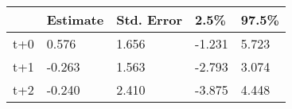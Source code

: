 \begin{tabular}{lllll}
  \toprule
  & Estimate & Std. Error & 2.5\% & 97.5\% \\ 
  \midrule
t+0 & 0.576 & 1.656 & -1.231 & 5.723 \\ 
  t+1 & -0.263 & 1.563 & -2.793 & 3.074 \\ 
  t+2 & -0.240 & 2.410 & -3.875 & 4.448 \\ 
   \bottomrule
\end{tabular}
